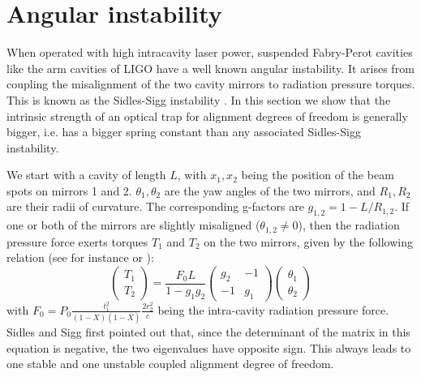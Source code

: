 \documentclass[%
 reprint,
 amsmath,amssymb,
 aps,
]{revtex4-1}
\begin{document}


\section{Angular instability}
\label{sec:IV} 
When operated with high intracavity laser power, suspended Fabry-Perot cavities like the arm cavities of LIGO have a well known angular instability. It  arises from coupling the misalignment of the two cavity mirrors to radiation pressure torques. This is known as the Sidles-Sigg instability \cite{Sidles06}. In this section we show that the intrinsic strength of an optical trap for alignment degrees of freedom is generally bigger, i.e. has a bigger spring constant than any associated Sidles-Sigg instability. 

We start with a cavity of length $L$, with $x_1,x_2$  being the position of the beam spots on mirrors 1 and 2. $\theta_1,\theta_2$ are the yaw angles of the two mirrors, and $R_1,R_2$ are their radii of curvature. The corresponding g-factors are $g_{1,2}=1-L/R_{1,2}$.
If one or both of the mirrors are slightly misaligned ($\theta_{1,2}\neq 0$), then the radiation pressure force exerts torques $T_1$ and $T_2$ on the two mirrors, given by the following relation (see for instance \cite{Sidles06} or \cite{Ballmer13}): 
\begin{equation}
\label{SidlesSigg_Basic}
\left(
\begin{array}{c}
T_1\\
T_2
\end{array}
\right)
=
\frac{F_0 L}{1-g_1 g_2}
\left(
\begin{array}{cc}
g_2 & -1\\
-1 & g_1
\end{array}
\right)
\left(
\begin{array}{c}
\theta_1\\
\theta_2
\end{array}
\right)
\end{equation} 
with $F_0=P_0\frac{t_1^2}{(1-X)(1-\overline{X})} \frac{2 r_2^2}{c}$ being the intra-cavity radiation pressure force. Sidles and Sigg first pointed out that, since the determinant of the matrix in this equation
 is negative, the two eigenvalues have opposite sign. This always leads to one stable and one unstable coupled alignment degree of freedom.
\end{document}
